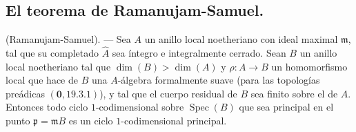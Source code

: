 \subsection{El teorema de Ramanujam-Samuel.}
\label{subsection:IV.21.14}
\label{IV.21.14}

\begin{theorem}[21.14.1]
\label{IV.21.14.1}
\textup{(Ramanujam-Samuel)}. ---
Sea $A$ un anillo local noetheriano con ideal maximal $\mathfrak m$, tal que su completado
$\widehat A$ sea íntegro e integralmente cerrado. Sean $B$ un anillo local noetheriano
tal que $\dim(B)>\dim(A)$ y $\rho:A\to B$ un homomorfismo local que hace de $B$
una $A$-álgebra formalmente suave \textup{(}para las topologías preádicas
$(\mathbf 0, 19.3.1)$\textup{)}, y tal que el cuerpo residual de $B$ sea finito sobre el de $A$.
Entonces todo ciclo $1$-codimensional sobre $\operatorname{Spec}(B)$ que sea principal en el
punto $\mathfrak p=\mathfrak mB$ es un ciclo $1$-codimensional principal.
\end{theorem}

